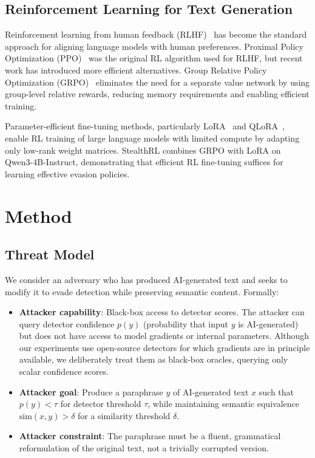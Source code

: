 \documentclass[11pt]{article}
\begin{document}
\subsection{Reinforcement Learning for Text Generation}

Reinforcement learning from human feedback (RLHF)~\cite{ouyang2022training} has become the standard approach for aligning language models with human preferences. Proximal Policy Optimization (PPO)~\cite{schulman2017ppo} was the original RL algorithm used for RLHF, but recent work has introduced more efficient alternatives. Group Relative Policy Optimization (GRPO)~\cite{pang2025grpo,shao2024deepseekmath} eliminates the need for a separate value network by using group-level relative rewards, reducing memory requirements and enabling efficient training.

Parameter-efficient fine-tuning methods, particularly LoRA~\cite{hu2021loralowrankadaptationlarge} and QLoRA~\cite{dettmers2023qlora}, enable RL training of large language models with limited compute by adapting only low-rank weight matrices. StealthRL combines GRPO with LoRA on Qwen3-4B-Instruct, demonstrating that efficient RL fine-tuning suffices for learning effective evasion policies.

\section{Method}
\label{sec:method}

\subsection{Threat Model}
\label{sec:threat}

We consider an adversary who has produced AI-generated text and seeks to modify it to evade detection while preserving semantic content. Formally:

\begin{itemize}[leftmargin=*,itemsep=2pt]
  \item \textbf{Attacker capability}: Black-box access to detector scores. The attacker can query detector confidence $p(y)$ (probability that input $y$ is AI-generated) but does not have access to model gradients or internal parameters. Although our experiments use open-source detectors for which gradients are in principle available, we deliberately treat them as black-box oracles, querying only scalar confidence scores.
  \item \textbf{Attacker goal}: Produce a paraphrase $y$ of AI-generated text $x$ such that $p(y) < \tau$ for detector threshold $\tau$, while maintaining semantic equivalence $\text{sim}(x, y) > \delta$ for a similarity threshold $\delta$.
  \item \textbf{Attacker constraint}: The paraphrase must be a fluent, grammatical reformulation of the original text, not a trivially corrupted version.
\end{itemize}
\end{document}
